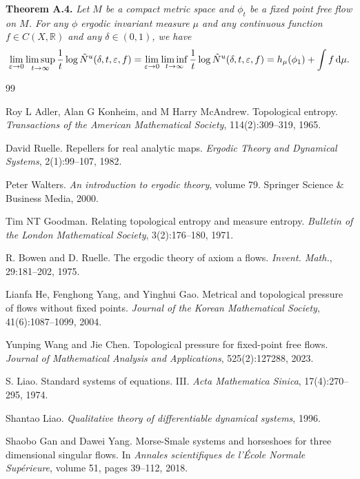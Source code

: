 \documentclass[10pt]{article}
\newtheorem*{Theorem A}{Theorem A}
\begin{document}
\bigskip

\noindent
\textbf{Theorem A.4. }
{\it Let \(M\) be a compact metric space and $\phi_t$ be a fixed point free flow on $M$. For any $\phi$ ergodic invariant measure $\mu$ and any continuous function \(f \in C(X, \mathbb{R})\) and any $\delta\in(0,1)$, we have
\[
\lim_{\varepsilon \to 0} \limsup_{t \to \infty} \frac{1}{t} \log \tilde{N}^u(\delta, t, \varepsilon, f) = \lim_{\varepsilon \to 0} \liminf_{t \to \infty} \frac{1}{t} \log \tilde{N}^u(\delta, t, \varepsilon, f)=h_\mu(\phi_1) + \int f \, {\rm d}\mu.
\]
}

\begin{thebibliography}{99}

Roy L Adler, Alan G Konheim, and M Harry McAndrew.
Topological entropy.
\textit{Transactions of the American Mathematical Society},
114(2):309--319, 1965.

David Ruelle.
Repellers for real analytic maps.
\textit{Ergodic Theory and Dynamical Systems},
2(1):99--107, 1982.

Peter Walters.
\textit{An introduction to ergodic theory},
volume 79. Springer Science \& Business Media, 2000.

Tim NT Goodman.
Relating topological entropy and measure entropy.
\textit{Bulletin of the London Mathematical Society},
3(2):176--180, 1971.

R. Bowen and D. Ruelle.
The ergodic theory of axiom a flows.
\textit{Invent. Math.},
29:181--202, 1975.

Lianfa He, Fenghong Yang, and Yinghui Gao.
Metrical and topological pressure of flows without fixed points.
\textit{Journal of the Korean Mathematical Society},
41(6):1087--1099, 2004.

Yunping Wang and Jie Chen.
Topological pressure for fixed-point free flows.
\textit{Journal of Mathematical Analysis and Applications},
525(2):127288, 2023.

S. Liao.
Standard systems of equations. III.
\textit{Acta Mathematica Sinica},
17(4):270--295, 1974.

Shantao Liao.
\textit{Qualitative theory of differentiable dynamical systems},
1996.

Shaobo Gan and Dawei Yang.
Morse-Smale systems and horseshoes for three dimensional singular flows.
In \textit{Annales scientifiques de l'\'Ecole Normale Sup\'erieure},
volume 51, pages 39--112, 2018.


\end{thebibliography}
\end{document}
